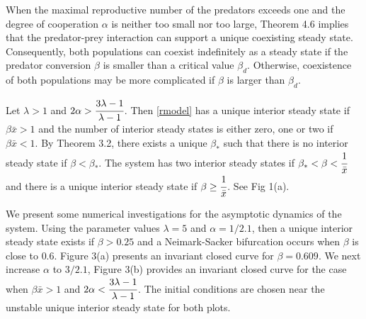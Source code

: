 \documentclass[11pt]{article}
\begin{document}
\medskip

When the maximal reproductive number of the predators exceeds one
 and the degree of cooperation $\alpha$ is neither too
small nor too large, Theorem 4.6 implies that the predator-prey
interaction can support a unique coexisting steady state.
Consequently,  both populations can coexist indefinitely as a
steady state if the predator conversion $\beta$ is smaller than a
critical value $\beta_d$. Otherwise, coexistence  of both
populations may be more complicated if $\beta$ is larger than
$\beta_d$.

 Let $\lambda>1$ and
$2\alpha>\cfrac{3\lambda-1}{\lambda-1}$. Then \eqref{rmodel} has a
unique interior steady state if  $\beta  \bar x>1$ and the number
of interior steady states is either zero, one or two if $\beta
\bar x<1$. By Theorem 3.2, there exists a unique $\beta_*$ such
that there is no interior steady state if $\beta<\beta_*$. The
system has two interior steady states if
$\beta_*<\beta<\cfrac{1}{\bar x}$ and there is a unique interior
steady state if $\beta\geq\cfrac{1}{\bar x}$. See Fig 1(a).








We present some numerical investigations for the asymptotic
dynamics of the system. Using the parameter values $\lambda=5$ and
$\alpha=1/2.1$, then a unique interior steady state exists if
$\beta>0.25$ and a Neimark-Sacker bifurcation occurs when $\beta$
is close to $0.6$. Figure 3(a) presents an invariant closed curve
for $\beta=0.609$. We next increase $\alpha$ to $3/2.1$, Figure
3(b) provides an invariant closed curve for the case when $\beta
\bar x>1$ and $2\alpha<\cfrac{3\lambda-1}{\lambda-1}$. The initial
conditions are chosen near the  unstable unique interior steady
state for both plots.
\end{document}

